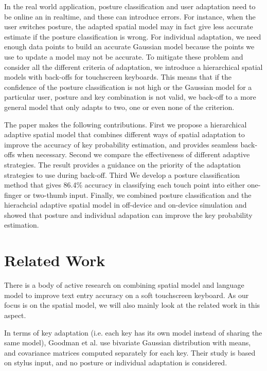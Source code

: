 \documentclass{sigchi}
\begin{document}
In the real world application, posture classification and user adaptation need to be
online an in realtime, and these can introduce errors. For instance, when the user switches posture,
the adapted spatial model may in fact give less accurate estimate if the posture classification
is wrong. For individual adaptation, we need enough data points to build
an accurate Gaussian model because the points we use to update a model may not be accurate. 
To mitigate these problem and consider all the different criteria of adaptation, we 
introduce a hierarchical spatial models with back-offs for touchscreen keyboards.  
This means that if the confidence of the posture classification is not high or the Gaussian model for a particular user, posture and key combination is 
not valid, we back-off to a more general model that only adapts to two, one or even none of 
the criterion. 

The paper makes the following contributions. First
we propose a hierarchical adaptive spatial model that combines different
ways of spatial adaptation to improve the accuracy of key probability estimation, and provides seamless back-offs when necessary.
Second we compare the effectiveness of different adaptive strategies.
The result provides a guidance on the priority of the adaptation strategies to use during 
back-off. Third We develop a posture classification method that gives 86.4\% accuracy in
classifying each touch point into either one-finger or two-thumb input. Finally, we 
combined posture classification and the hierachcial adaptive spatial model in off-device and 
on-device simulation and showed that posture and individual adapation can improve the key probability
estimation.

\section{Related Work}
There is a body of active research on combining spatial model and language model
to improve text entry accuracy on a soft touchscreen keyboard. As our focus is on the 
spatial model, we will also mainly look at the related work in this aspect.    

In terms of key adaptation (i.e. each key has its own model instead of
sharing the same model), Goodman et al. \cite{Goodman:2002} use bivariate Gaussian distribution with means, and
covariance matrices computed separately for each key. Their study is based on stylus input, and
no posture or individual adaptation is considered.
\end{document}
